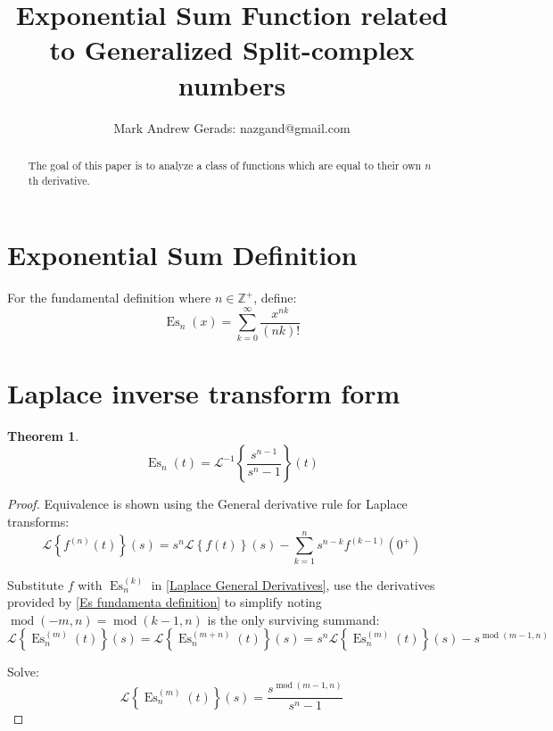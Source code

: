 \documentclass[]{article}
\author{Mark Andrew Gerads: nazgand@gmail.com}
\title{Exponential Sum Function related to Generalized Split-complex numbers}
\DeclareMathOperator{\es}{Es}
\DeclareMathOperator{\md}{mod}
\newcommand{\pqty}[1]{{\left(#1\right)}}
\newcommand{\Bqty}[1]{{\left\{#1\right\}}}
\newcommand{\laplace}[1]{\mathcal{L}\Bqty{#1}\pqty{s}}
\newcommand{\laplaceInv}[1]{\mathcal{L}^{-1}\Bqty{#1}\pqty{t}}
\newtheorem{theorem}{Theorem}[section]
\numberwithin{equation}{section}
\begin{document}
	
	\maketitle
	
	\begin{abstract}
		The goal of this paper is to analyze a class of functions which are equal to their own \(n\)th derivative.
	\end{abstract}
	
	\section{Exponential Sum Definition}
	For the fundamental definition where \(n\in\mathbb{Z}^+\), define:
	\begin{equation}
	\label{Es fundamenta definition}
	\es_n\pqty{x}=
	\sum_{k=0}^{\infty}\frac{x^{nk}}{\pqty{nk}!}
	\end{equation}
	
	\section{Laplace inverse transform form}
	\begin{theorem}
			\begin{equation}
		\es_n\pqty{t}=
		\laplaceInv{\frac{s^{n-1}}{s^n-1}}
		\end{equation}
	\end{theorem}
	\begin{proof}
			Equivalence is shown using the General derivative rule for Laplace transforms:
		\begin{equation}
		\label{Laplace General Derivatives}
		\laplace{f^{(n)}\pqty{t}}=
		s^n \laplace{f\pqty{t}} - \sum_{k=1}^{n} s^{n-k} f^{(k-1)}\pqty{0^{+}}
		\end{equation}
		
		Substitute \(f\) with \(\es_n^{(k)}\) in \eqref{Laplace General Derivatives}, use the derivatives provided by \eqref{Es fundamenta definition} to simplify noting \(\md\pqty{-m,n}=\md\pqty{k-1,n}\) is the only surviving summand:
		\begin{equation}
		\laplace{\es_n^{(m)}\pqty{t}}=
		\laplace{\es_n^{(m+n)}\pqty{t}}=
		s^n\laplace{\es_n^{(m)}\pqty{t}}-s^{\md\pqty{m-1,n}}
		\end{equation}
		
		Solve:
		\begin{equation}
		\laplace{\es_n^{(m)}\pqty{t}}=
		\frac{s^{\md\pqty{m-1,n}}}{s^n-1}
		\end{equation}
	\end{proof}
	
\end{document}
